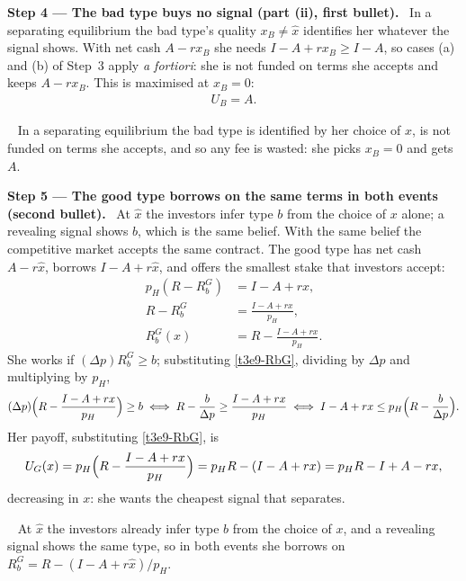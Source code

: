 \documentclass[11pt,a4paper]{article}
\newcommand{\step}[2]{\par\medskip\noindent\textbf{Step #1 --- #2.}~}
\newcommand{\answer}[1]{\par\smallskip\noindent\fbox{\textbf{Answer #1.}}~}
\begin{document}
\step{4}{The bad type buys no signal (part (ii), first bullet)} In a separating equilibrium the bad type's
quality $x_B\ne\hat x$ identifies her whatever the signal shows. With net cash $A-rx_B$ she needs
$I-A+rx_B\ge I-A$, so cases (a) and (b) of Step~3 apply \emph{a fortiori}: she is not funded on terms she
accepts and keeps $A-rx_B$. This is maximised at $x_B=0$:
\begin{align}
  U_B = A. \label{t3e9-UB}
\end{align}

\answer{(ii-1)} In a separating equilibrium the bad type is identified by her choice of $x$, is not funded on terms she accepts, and so any fee is wasted: she picks $x_B=0$ and gets $A$.

\step{5}{The good type borrows on the same terms in both events (second bullet)} At $\hat x$ the
investors infer type $b$ from the choice of $x$ alone; a revealing signal shows $b$, which is the same
belief. With the same belief the competitive market accepts the same contract. The good type has net
cash $A-r\hat x$, borrows $I-A+r\hat x$, and offers the smallest stake that investors accept:
\begin{align}
  p_H(R-R_b^G) &= I-A+rx, \label{t3e9-be}\\
  R-R_b^G &= \frac{I-A+rx}{p_H}, \nonumber\\
  R_b^G(x) &= R-\frac{I-A+rx}{p_H}. \label{t3e9-RbG}
\end{align}
She works if $(\Delta p)R_b^G\ge b$; substituting \eqref{t3e9-RbG}, dividing by $\Delta p$ and multiplying by $p_H$,
\begin{align}
  (\Delta p)\Bigl(R-\frac{I-A+rx}{p_H}\Bigr) \ge b
  \iff R-\frac{b}{\Delta p}\ge\frac{I-A+rx}{p_H}
  \iff I-A+rx \le p_H\Bigl(R-\frac{b}{\Delta p}\Bigr). \label{t3e9-icG}
\end{align}
Her payoff, substituting \eqref{t3e9-RbG}, is
\begin{align}
  U_G(x) = p_H\Bigl(R-\frac{I-A+rx}{p_H}\Bigr) = p_HR-(I-A+rx) = p_HR-I+A-rx, \label{t3e9-UG}
\end{align}
decreasing in $x$: she wants the cheapest signal that separates.

\answer{(ii-2)} At $\hat x$ the investors already infer type $b$ from the choice of $x$, and a revealing signal shows the same type, so in both events she borrows on $R_b^G=R-(I-A+r\hat x)/p_H$.
\end{document}
